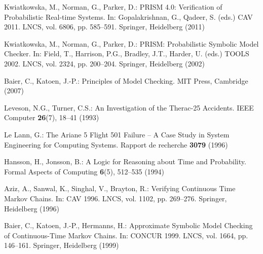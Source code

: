 \documentclass[runningheads]{llncs}
\begin{document}
\begin{thebibliography}{8}

Kwiatkowska, M., Norman, G., Parker, D.: PRISM 4.0: Verification of Probabilistic Real-time Systems. In: Gopalakrishnan, G., Qadeer, S. (eds.) CAV 2011. LNCS, vol. 6806, pp. 585--591. Springer, Heidelberg (2011)

Kwiatkowska, M., Norman, G., Parker, D.: PRISM: Probabilistic Symbolic Model Checker. In: Field, T., Harrison, P.G., Bradley, J.T., Harder, U. (eds.) TOOLS 2002. LNCS, vol. 2324, pp. 200--204. Springer, Heidelberg (2002)

Baier, C., Katoen, J.-P.: Principles of Model Checking. MIT Press, Cambridge (2007)

Leveson, N.G., Turner, C.S.: An Investigation of the Therac-25 Accidents. IEEE Computer \textbf{26}(7), 18--41 (1993)

Le Lann, G.: The Ariane 5 Flight 501 Failure -- A Case Study in System Engineering for Computing Systems. Rapport de recherche \textbf{3079} (1996)

Hansson, H., Jonsson, B.: A Logic for Reasoning about Time and Probability. Formal Aspects of Computing \textbf{6}(5), 512--535 (1994)

Aziz, A., Sanwal, K., Singhal, V., Brayton, R.: Verifying Continuous Time Markov Chains. In: CAV 1996. LNCS, vol. 1102, pp. 269--276. Springer, Heidelberg (1996)

Baier, C., Katoen, J.-P., Hermanns, H.: Approximate Symbolic Model Checking of Continuous-Time Markov Chains. In: CONCUR 1999. LNCS, vol. 1664, pp. 146--161. Springer, Heidelberg (1999)

\end{thebibliography}
\end{document}

